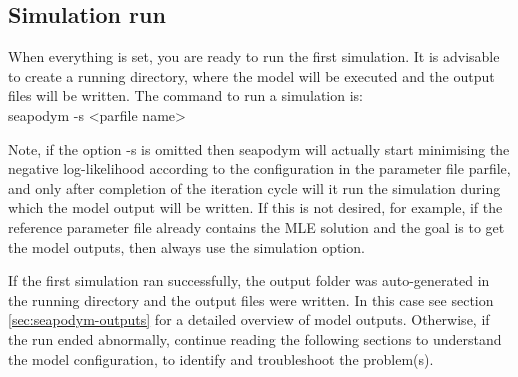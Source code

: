 

\subsection{Simulation run}

When everything is set, you are ready to run the first simulation. It is advisable to create a running directory, where the model will be executed and the output files will be written. The command to run a simulation is: \\

{\ttfamily 
  seapodym -s <parfile name> \\
}

\noindent Note, if the option {\ttfamily -s} is omitted then {\ttfamily seapodym} will actually start minimising the negative log-likelihood according to the configuration in the parameter file {\ttfamily parfile}, and only after completion of the iteration cycle will it run the simulation during which the model output will be written. If this is not desired, for example, if the reference parameter file already contains the MLE solution and the goal is to get the model outputs, then always use the simulation option.

If the first simulation ran successfully, the output folder was auto-generated in the running directory and the output files were written. In this case see section \ref{sec:seapodym-outputs} for a detailed overview of model outputs. Otherwise, if the run ended abnormally, continue reading the following sections to understand the model configuration, to identify and troubleshoot the problem(s).




